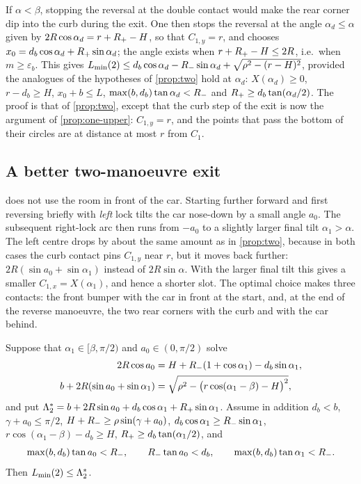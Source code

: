 \begin{remark}\label{rem:two-other}
If $\alpha<\beta$, stopping the reversal at the double contact would make the rear corner dip into the curb during the exit.
One then stops the reversal at the angle $\alpha_d\le\alpha$ given by $2R\cos\alpha_d=r+R_{+}-H$, so that $C_{1,y}=r$, and chooses $x_0=d_b\cos\alpha_d+R_{+}\sin\alpha_d$; the angle exists when $r+R_{+}-H\le2R$, i.e.\ when $m\ge\varepsilon_b$.
This gives $L_{\min}(2)\le d_b\cos\alpha_d-R_{-}\sin\alpha_d+\sqrt{\rho^2-(r-H)^2}$, provided the analogues of the hypotheses of \cref{prop:two} hold at $\alpha_d$: $X(\alpha_d)\ge0$, $r-d_b\ge H$, $x_0+b\le L$, $\max(b,d_b)\tan\alpha_d<R_{-}$ and $R_{+}\ge d_b\tan(\alpha_d/2)$.
The proof is that of \cref{prop:two}, except that the curb step of the exit is now the argument of \cref{prop:one-upper}: $C_{1,y}=r$, and the points that pass the bottom of their circles are at distance at most $r$ from $C_1$.
\end{remark}

\subsection{A better two-manoeuvre exit}\label{sec:two-better}

 does not use the room in front of the car.
Starting further forward and first reversing briefly with \emph{left} lock tilts the car nose-down by a small angle $a_0$.
The subsequent right-lock arc then runs from $-a_0$ to a slightly larger final tilt $\alpha_1>\alpha$.
The left centre drops by about the same amount as in \cref{prop:two}, because in both cases the curb contact pins $C_{1,y}$ near $r$, but it moves back further: $2R(\sin a_0+\sin\alpha_1)$ instead of $2R\sin\alpha$.
With the larger final tilt this gives a smaller $C_{1,x}=X(\alpha_1)$, and hence a shorter slot.
The optimal choice makes three contacts: the front bumper with the car in front at the start, and, at the end of the reverse manoeuvre, the two rear corners with the curb and with the car behind.

\begin{proposition}\label{prop:two-better}
Suppose that $\alpha_1\in[\beta,\pi/2)$ and $a_0\in(0,\pi/2)$ solve
\begin{align}
  2R\cos a_0&=H+R_{-}(1+\cos\alpha_1)-d_b\sin\alpha_1, \label{eq:tc1}\\
  b+2R(\sin a_0+\sin\alpha_1)&=\sqrt{\rho^2-\big(r\cos(\alpha_1-\beta)-H\big)^2}, \label{eq:tc2}
\end{align}
and put $\Lambda_2^*=b+2R\sin a_0+d_b\cos\alpha_1+R_{+}\sin\alpha_1$.
Assume in addition $d_b<b$, $\gamma+a_0\le\pi/2$, $H+R_{-}\ge\rho\sin(\gamma+a_0)$, $d_b\cos\alpha_1\ge R_{-}\sin\alpha_1$, $r\cos(\alpha_1-\beta)-d_b\ge H$, $R_{+}\ge d_b\tan(\alpha_1/2)$, and
\[
  \max(b,d_b)\tan a_0<R_{-},\qquad R_{-}\tan a_0<d_b,\qquad \max(b,d_b)\tan\alpha_1<R_{-} .
\]
Then $L_{\min}(2)\le\Lambda_2^*$.
\end{proposition}


